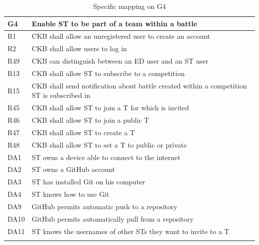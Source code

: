   \begin{longtable}{|l|p{12cm}|}
    \hline
    \textbf{G4} & \textbf{Enable ST to be part of a team within a battle}      \\
    \hline
    R1 & CKB shall allow an unregistered user to create an account \\
    \hline
    R2 & CKB shall allow users to log in \\
    \hline
    R49 & CKB can distinguish between an ED user and an ST user \\
    \hline
    R13 & CKB shall allow ST to subscribe to a competition \\
    \hline
    R15 & CKB shall send notification about battle created within a competition ST is subscribed in \\
    \hline
    R45 & CKB shall allow ST to join a T for which is invited \\
    \hline
    R46 & CKB shall allow ST to join a public T \\
    \hline
    R47 & CKB shall allow ST to create a T \\
    \hline
    R48 & CKB shall allow ST to set a T to public or private \\
    \hline
    DA1 & ST owns a device able to connect to the internet \\
    \hline
    DA2 & ST owns a GitHub account \\
    \hline
    DA3 & ST has installed Git on his computer \\
    \hline
    DA4 & ST knows how to use Git \\
    \hline
    DA9 & GitHub permits automatic push to a repository \\
    \hline
    DA10 & GitHub permits automatically pull from a repository \\
    \hline
    DA11 & ST knows the usernames of other STs they want to invite to a T \\
    \hline

    \caption{Specific mapping on G4}
    \label{tab:mappingG4}
  \end{longtable}

